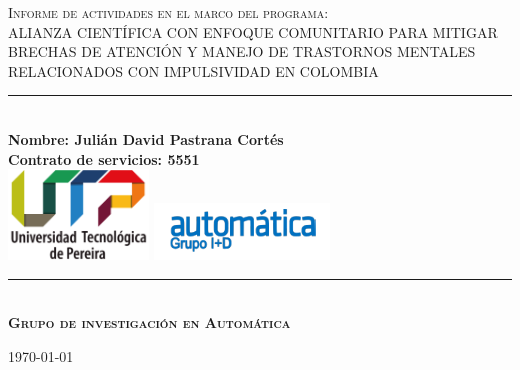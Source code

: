 \vspace*{0.5cm}
\begin{center}
	\newcommand{\HRule}{\rule{\linewidth}{0.5mm}}
	\vspace*{-1.5cm}
	\textsc{\LARGE Informe de actividades en el marco del programa: \\ 
		\vspace{0.4cm}
		ALIANZA CIENTÍFICA CON ENFOQUE COMUNITARIO PARA MITIGAR BRECHAS DE ATENCIÓN Y MANEJO DE TRASTORNOS MENTALES RELACIONADOS CON IMPULSIVIDAD EN COLOMBIA
		}\\
	\vspace{2cm}
	\HRule \\[0.4cm]
	{ \bfseries Nombre: Julián David Pastrana Cortés }\\[0.4cm]
	{ \bfseries Contrato de servicios: 5551 }\\[0.4cm]
	\vspace{1.5cm}
	\includegraphics[width=0.28\textwidth]{imagenes/LogoU.png}
	\includegraphics[width=0.35\textwidth]{imagenes/logo_automatica.png}
	\HRule \\[1.5cm]
	\vspace{1.5cm}
	\vspace*{0.5cm}
	\textsc{\textbf{\Large Grupo de investigación en Automática } }\\
	\vspace{3.5cm} 
	\begin{center}
		{\large \today}
	\end{center}
\end{center}
\newpage
